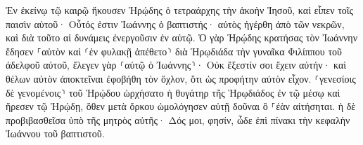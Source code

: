 \documentclass{openreader}
\begin{document}
Ἐν ἐκείνῳ τῷ καιρῷ ἤκουσεν Ἡρῴδης ὁ τετραάρχης τὴν ἀκοὴν Ἰησοῦ, 
καὶ εἶπεν τοῖς παισὶν αὐτοῦ· Οὗτός ἐστιν Ἰωάννης ὁ βαπτιστής· αὐτὸς ἠγέρθη ἀπὸ τῶν νεκρῶν, καὶ διὰ τοῦτο αἱ δυνάμεις ἐνεργοῦσιν ἐν αὐτῷ. 
Ὁ γὰρ Ἡρῴδης κρατήσας τὸν Ἰωάννην ἔδησεν ⸀αὐτὸν καὶ ⸂ἐν φυλακῇ ἀπέθετο⸃ διὰ Ἡρῳδιάδα τὴν γυναῖκα Φιλίππου τοῦ ἀδελφοῦ αὐτοῦ, 
ἔλεγεν γὰρ ⸂αὐτῷ ὁ Ἰωάννης⸃· Οὐκ ἔξεστίν σοι ἔχειν αὐτήν· 
καὶ θέλων αὐτὸν ἀποκτεῖναι ἐφοβήθη τὸν ὄχλον, ὅτι ὡς προφήτην αὐτὸν εἶχον. 
⸂γενεσίοις δὲ γενομένοις⸃ τοῦ Ἡρῴδου ὠρχήσατο ἡ θυγάτηρ τῆς Ἡρῳδιάδος ἐν τῷ μέσῳ καὶ ἤρεσεν τῷ Ἡρῴδῃ, 
ὅθεν μετὰ ὅρκου ὡμολόγησεν αὐτῇ δοῦναι ὃ ⸀ἐὰν αἰτήσηται. 
ἡ δὲ προβιβασθεῖσα ὑπὸ τῆς μητρὸς αὐτῆς· Δός μοι, φησίν, ὧδε ἐπὶ πίνακι τὴν κεφαλὴν Ἰωάννου τοῦ βαπτιστοῦ. 
\end{document}
